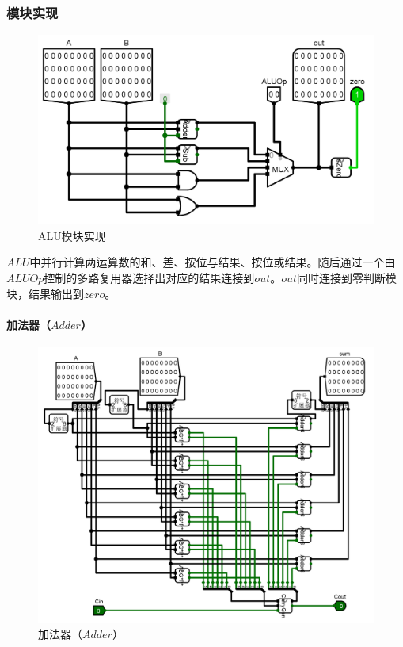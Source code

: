 \documentclass[main.tex]{subfiles}
\begin{document}
\subsubsection{模块实现}
\begin{figure}[h]
\centering
\includegraphics[width=\textwidth]{images/ALU-circuit.png}
\caption{ALU模块实现}
\end{figure}
$ALU$中并行计算两运算数的和、差、按位与结果、按位或结果。随后通过一个由$ALUOp$控制的多路复用器选择出对应的结果连接到$out$。$out$同时连接到零判断模块，结果输出到$zero$。

\paragraph{加法器（$Adder$）}

\begin{figure}[H]
\centering
\includegraphics[width=\textwidth]{images/Adder-circuit.png}
\caption{加法器（$Adder$）}
\end{figure}
\end{document}
